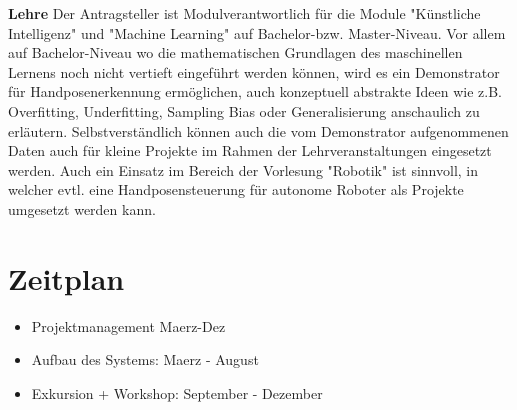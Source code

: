 \documentclass{article}
\begin{document}
\textbf{Lehre}
Der Antragsteller ist Modulverantwortlich für die Module "Künstliche Intelligenz" und "Machine Learning" auf Bachelor-bzw. Master-Niveau. Vor allem auf Bachelor-Niveau wo die mathematischen Grundlagen des maschinellen Lernens noch nicht vertieft eingeführt werden können, wird es ein Demonstrator für Handposenerkennung ermöglichen, auch konzeptuell abstrakte Ideen wie z.B. Overfitting, Underfitting, Sampling Bias oder Generalisierung anschaulich zu erläutern. Selbstverständlich können auch die vom Demonstrator aufgenommenen Daten auch für kleine Projekte im Rahmen der Lehrveranstaltungen eingesetzt werden. Auch ein Einsatz im Bereich der Vorlesung "Robotik" ist sinnvoll, in welcher evtl. eine Handposensteuerung für autonome Roboter als Projekte umgesetzt werden kann.
%
\renewcommand{\thesection}{7}
\section{Zeitplan}
\begin{itemize}
\item Projektmanagement Maerz-Dez
\item Aufbau des Systems: Maerz - August
\item Exkursion + Workshop: September - Dezember

\end{itemize}

\renewcommand{\thesection}{8}
\end{document}
